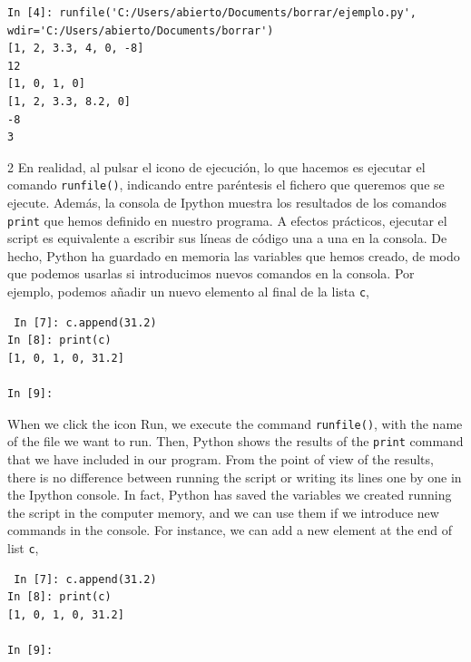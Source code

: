 \begin{verbatim}
In [4]: runfile('C:/Users/abierto/Documents/borrar/ejemplo.py', 
wdir='C:/Users/abierto/Documents/borrar')
[1, 2, 3.3, 4, 0, -8]
12
[1, 0, 1, 0]
[1, 2, 3.3, 8.2, 0]
-8
3
\end{verbatim}
\begin{paracol}{2}
En realidad, al pulsar el icono de ejecución, lo que hacemos es ejecutar el comando \texttt{runfile()}, indicando entre paréntesis el fichero que queremos que se ejecute. Además, la consola de Ipython muestra los resultados de los comandos \texttt{print} que hemos definido en nuestro programa. A efectos prácticos, ejecutar el script es equivalente a escribir sus líneas de código una a una en la consola. De hecho, Python ha guardado en memoria las variables que hemos creado, de modo que podemos usarlas si introducimos nuevos comandos en la consola. Por ejemplo, podemos añadir un nuevo elemento al final de la lista \texttt{c},
\begin{verbatim}
 In [7]: c.append(31.2)
In [8]: print(c)
[1, 0, 1, 0, 31.2]

In [9]:    
\end{verbatim}
\switchcolumn
When we click the icon Run, we execute the command \texttt{runfile()}, with the name of the file we want to run. Then, Python shows the results of the \texttt{print} command that we have included in our program. From the point of view of the results, there is no difference between running the script or writing its lines one by one in the Ipython console. In fact, Python has saved the variables we created running the script in the computer memory, and we can use them if we introduce new commands in the console. For instance, we can add a new element at the end of list \texttt{c},
\begin{verbatim}
 In [7]: c.append(31.2)
In [8]: print(c)
[1, 0, 1, 0, 31.2]

In [9]:    
\end{verbatim}
\end{paracol}
